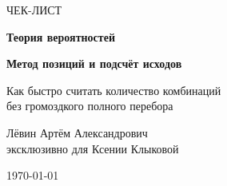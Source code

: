 \documentclass[a4paper,12pt]{article}
\begin{document}

\begin{titlepage}
    \thispagestyle{empty}
    \centering

    \vspace*{2.8cm}

    {\Large\color{muted} ЧЕК-ЛИСТ\par}

    \vspace{0.8cm}

    {\fontsize{26}{32}\selectfont
    \bfseries\color{darkaccent}
    Теория вероятностей\par}

    \vspace{0.35cm}

    {\LARGE\bfseries
    Метод позиций и подсчёт исходов\par}

    \vspace{1.4cm}

    {\large
    Как быстро считать количество комбинаций\\
    без громоздкого полного перебора\par}

    \vfill

    {\large
    Лёвин Артём Александрович\\[0.25em]
    эксклюзивно для Ксении Клыковой\par}

    \vspace{0.8cm}

    {\large \today\par}

    \vspace{1.4cm}


    \vspace{0.8cm}
\end{titlepage}

\end{document}
